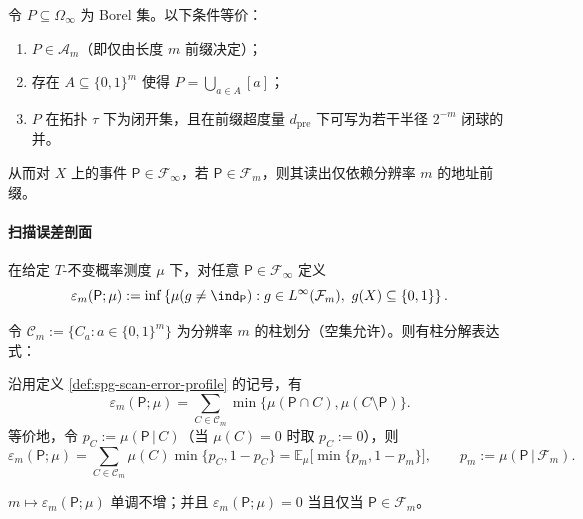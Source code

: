 \begin{proposition}[可判定性与闭开性]\label{prop:spg-decidable-clopen}
令 $P\subseteq\Omega_\infty$ 为 Borel 集。以下条件等价：
\begin{enumerate}
  \item $P\in\mathcal{A}_m$（即仅由长度 $m$ 前缀决定）；
  \item 存在 $A\subseteq\{0,1\}^m$ 使得 $P=\bigcup_{a\in A}[a]$；
  \item $P$ 在拓扑 $\tau$ 下为闭开集，且在前缀超度量 $d_{\mathrm{pre}}$ 下可写为若干半径 $2^{-m}$ 闭球的并。
\end{enumerate}
从而对 $X$ 上的事件 $\mathsf P\in\mathcal{F}_\infty$，若 $\mathsf P\in\mathcal{F}_m$，则其读出仅依赖分辨率 $m$ 的地址前缀。
\end{proposition}

\paragraph{扫描误差剖面}
\begin{definition}[扫描误差剖面]\label{def:spg-scan-error-profile}
在给定 $T$-不变概率测度 $\mu$ 下，对任意 $\mathsf P\in\mathcal{F}_\infty$ 定义
\[
\varepsilon_m(\mathsf P;\mu)
:=\inf\left\{\mu(g\neq \ind_{\mathsf P}): g\in L^\infty(\mathcal{F}_m),\ g(X)\subseteq\{0,1\}\right\}.
\]
\end{definition}

令 $\mathcal{C}_m:=\{C_a:a\in\{0,1\}^m\}$ 为分辨率 $m$ 的柱划分（空集允许）。则有柱分解表达式：

\begin{proposition}[柱分解的精确表达]\label{prop:spg-scan-error-cylinder}
沿用定义 \ref{def:spg-scan-error-profile} 的记号，有
\[
\varepsilon_m(\mathsf P;\mu)
=\sum_{C\in\mathcal{C}_m}\min\{\mu(\mathsf P\cap C),\mu(C\setminus \mathsf P)\}.
\]
等价地，令 $p_C:=\mu(\mathsf P\,|\,C)$（当 $\mu(C)=0$ 时取 $p_C:=0$），则
\[
\varepsilon_m(\mathsf P;\mu)
=\sum_{C\in\mathcal{C}_m}\mu(C)\min\{p_C,1-p_C\}
=\mathbb{E}_\mu\bigl[\min\{p_m,1-p_m\}\bigr],
\qquad
p_m:=\mu(\mathsf P\,|\,\mathcal{F}_m).
\]
\end{proposition}

\begin{corollary}[清晰度的基本性质]\label{cor:spg-clarity-basic}
$m\mapsto\varepsilon_m(\mathsf P;\mu)$ 单调不增；并且 $\varepsilon_m(\mathsf P;\mu)=0$ 当且仅当 $\mathsf P\in\mathcal{F}_m$。
\end{corollary}

